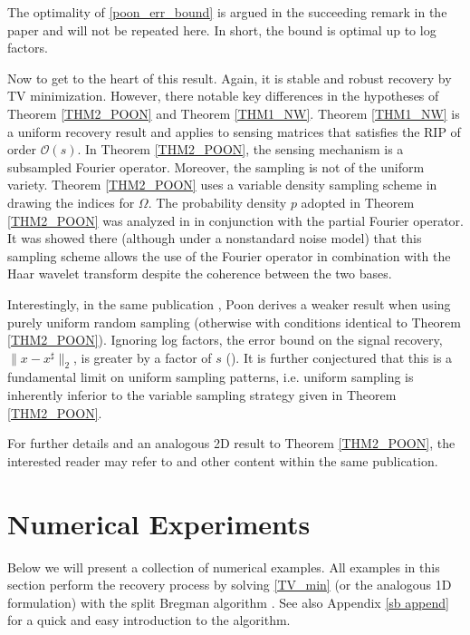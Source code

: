 \documentclass[11pt, oneside]{article}   %
\renewcommand{\O}{\mathcal{O}}
\newcommand{\norm}[1]{\lVert #1 \rVert}
\begin{document}
The optimality of \eqref{poon_err_bound} is argued in the succeeding remark in 
the paper and will not be repeated here. In short, the bound is 
optimal up to log factors. 

Now to get to the heart of this result. Again, it is stable and robust recovery by TV minimization. However, there notable key differences in the hypotheses of Theorem \ref{THM2_POON} and Theorem \ref{THM1_NW}. Theorem \ref{THM1_NW} is a uniform recovery result and applies to sensing matrices that satisfies the RIP of order $\O(s)$. In Theorem \ref{THM2_POON}, the sensing mechanism is a subsampled Fourier operator. Moreover, the sampling is not of the uniform variety. Theorem \ref{THM2_POON} uses a variable density sampling scheme in drawing the indices for $\Omega$.  The probability density $p$ adopted in Theorem \ref{THM2_POON} was analyzed in \cite{krahmer2012stable} in conjunction with the partial Fourier operator. It was showed there (although under a nonstandard noise model) that this sampling scheme allows the use of the Fourier operator in combination with the Haar wavelet transform despite the coherence between the two bases. 

Interestingly, in the same publication \cite{poon2015tv}, Poon derives a weaker result 
when using purely uniform random sampling (otherwise with conditions identical to Theorem \ref{THM2_POON}). Ignoring log factors, the error bound on the signal recovery, $\norm{x - x^\sharp}_2$, is greater by a factor of $s$ (\!\!\cite[Theorem 2.3]{poon2015tv}). It is further conjectured that this is a fundamental limit on uniform sampling patterns, i.e. uniform sampling is inherently inferior to the variable sampling strategy given in Theorem \ref{THM2_POON}. 

For further details and an analogous 2D result to Theorem \ref{THM2_POON}, the interested reader may refer to \cite[Theorem 2.2]{poon2015tv} and other content within the same publication. 

%
% 
\section{Numerical Experiments}
Below we will present a collection of numerical examples. All examples in this 
section perform the recovery process by solving \eqref{TV_min} (or the analogous 1D formulation) with the split Bregman algorithm \cite{goldstein2009split}. See also Appendix \ref{sb append} for a quick and easy introduction to the algorithm.
\end{document}
